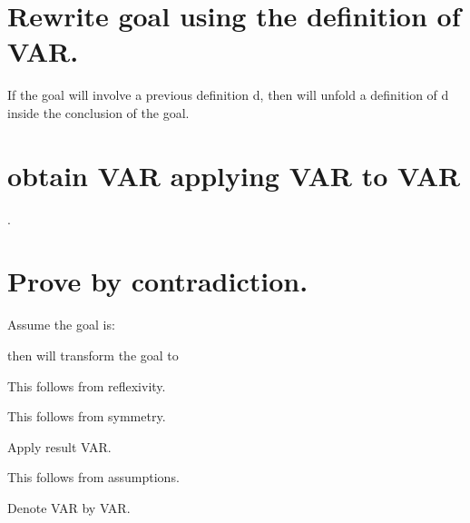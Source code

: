  
 

\section{Rewrite goal using the definition of VAR.}
If the goal will involve a previous definition d, then
 will unfold a definition of d inside the conclusion of the goal.


\section{obtain VAR applying VAR to VAR}.

\section{Prove by contradiction.}

Assume the goal is:

 
 then  
  will transform the goal to
 


This follows from reflexivity.


This follows from symmetry.


Apply result VAR.


This follows from assumptions.

Denote VAR by VAR.